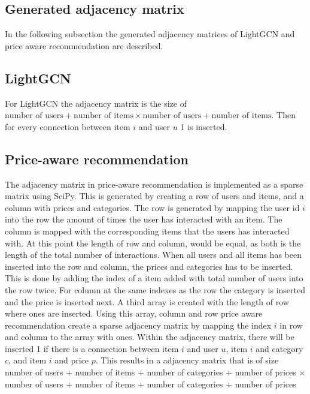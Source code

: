 \subsection{Generated adjacency matrix}
In the following subsection the generated adjacency matrices of LightGCN and price aware recommendation are described.

\subsection{LightGCN}
For LightGCN the adjacency matrix is the size of $\textrm{number of users} + \textrm{number of items} \times \textrm{number of users} + \textrm{number of items}$.
Then for every connection between item $i$ and user $u$ 1 is inserted.

\subsection{Price-aware recommendation}
The adjacency matrix in price-aware recommendation is implemented as a sparse matrix using SciPy.
This is generated by creating a row of users and items, and a column with prices and categories.
The row is generated by mapping the user id $i$ into the row the amount of times the user has interacted with an item.
The column is mapped with the corresponding items that the users has interacted with.
At this point the length of row and column, would be equal, as both is the length of the total number of interactions.
When all users and all items has been inserted into the row and column, the prices and categories has to be inserted.
This is done by adding the index of a item added with total number of users into the row twice.
For column at the same indexes as the row the category is inserted and the price is inserted next.
A third array is created with the length of row where ones are inserted.
Using this array, column and row price aware recommendation create a sparse adjacency matrix by mapping the index $i$ in row and column to the array with ones.
Within the adjacency matrix, there will be inserted 1 if there is a connection between item $i$ and user $u$, item $i$ and category $c$, and item $i$ and price $p$.
This results in a adjacency matrix that is of size number of users + number of items + number of categories + number of prices $\times$ number of users + number of items + number of categories + number of prices
